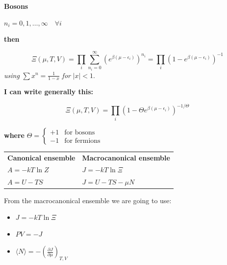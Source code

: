 \documentclass[12pt,a4paper]{report}
\newcommand{\esp}{\vspace{0.5cm}}
\begin{document}
	\esp
	
	\noindent \textbf{Bosons}
	
	\esp
	
	$n_i = 0, 1, \dots, \infty \quad \forall i$
	
	\esp
	
	\noindent \textbf{then}
	
	\esp
	
	\begin{equation}
		\Xi(\mu, T, V) = \prod_i \sum_{n_i=0}^{\infty} \left( e^{\beta (\mu - \epsilon_i)} \right)^{n_i} = \prod_i \left( 1 - e^{\beta (\mu - \epsilon_i)} \right)^{-1}
	\end{equation}
	\textit{using } $\sum x^n = \frac{1}{1-x}$ \textit{ for } $|x| < 1$.
	
	\esp
	
	\noindent \textbf{I can write generally this:}
	
	\esp
	
	\begin{equation}
		\Xi(\mu, T, V) = \prod_i \left( 1 - \Theta e^{\beta (\mu - \epsilon_i)} \right)^{-1/\Theta}
	\end{equation}
	
	\esp
	
	\textbf{where } $\Theta = \begin{cases} +1 & \text{for bosons} \\ -1 & \text{for fermions} \end{cases}$

	\esp
	
	\begin{table}[h]
		\centering
		\begin{tabular}{ll}
			\textbf{Canonical ensemble} & \textbf{Macrocanonical ensemble} \\
			$A = -kT \ln Z$ & $J = -kT \ln \Xi$ \\
			$A = U - TS$ & $J = U - TS - \mu N$
		\end{tabular}
	\end{table}
	
	\esp
	
	From the macrocanonical ensemble we are going to use:
	\begin{itemize}
		\item $J = -kT \ln \Xi$
		\item $PV = -J$
		\item $\langle N \rangle = - \left( \frac{\partial J}{\partial \mu} \right)_{T, V}$
	\end{itemize}
	
\end{document}
